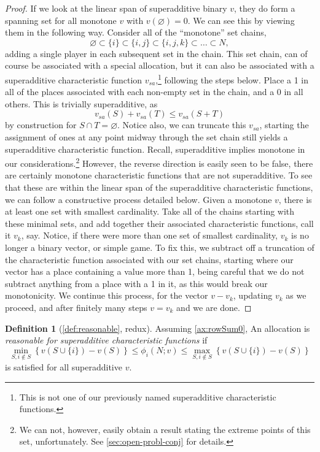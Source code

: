\documentclass[12pt,letterpaper,final]{article}
\theoremstyle{plain}
\theoremstyle{plain}
\theoremstyle{plain}
\theoremstyle{plain}
\theoremstyle{plain}
\theoremstyle{plain}
\theoremstyle{plain}
\theoremstyle{definition}
\newtheorem{definition}{Definition}[section]
\theoremstyle{definition}
\theoremstyle{definition}
\theoremstyle{definition}
\theoremstyle{definition}
\theoremstyle{remark}
\theoremstyle{remark}
\theoremstyle{remark}
\theoremstyle{remark}
\begin{document}
\begin{proof}
  If we look at the linear span of superadditive
  binary \(v\), they do form a spanning set for all monotone \(v\)
  with \(v(\varnothing) = 0\). We can see this by viewing them in the
  following way. Consider all of the ``monotone'' set chains,
  \[
    \varnothing \subset \{i\}\subset \{i,j\}\subset \{i,j,k\} \subset \ldots
    \subset N,
  \]
  adding a single player in each subsequent set in the chain. This set chain, can
  of course be associated with a special allocation, but it can also be
  associated with a superadditive characteristic function
  \(v_{sa}\),\footnote{This is not one of our previously named
    superadditive characteristic functions.}
  following the steps below. 
  Place a 1 in all of the places associated with each non-empty set in
  the chain, and a 0 in all others. This is trivially superadditive,
  as
  \[
    v_{sa}(S) + v_{sa}(T) \leq v_{sa}(S+T)
  \]
  by construction for \(S\cap T = \varnothing\). Notice also, we can
  truncate this \(v_{sa}\), starting the assignment of ones at any
  point midway through the set chain still yields a superadditive
  characteristic function.  Recall, superadditive implies
  monotone in our considerations.\footnote{We can not, however, easily obtain a
    result stating the extreme points of this set, unfortunately. See
    \cref{sec:open-probl-conj} for details.}
  However, the reverse direction is easily seen to be false, there are
  certainly monotone characteristic functions that are not superadditive. To see that
  these are within the linear span of the superadditive characteristic
  functions, we
  can follow a constructive process detailed below.
  Given a monotone \(v\), there is at least one set with smallest
  cardinality. Take all of the chains starting with these minimal sets,
  and add together their associated characteristic functions,
  call it \(v_{k}\), say. Notice, if there were more than one set of
  smallest cardinality, \(v_k\) is no longer a binary vector, or
  simple game. To fix
  this, we subtract off a truncation of the characteristic function associated with
  our set chains, starting where our vector has a place containing a
  value more than 1, being careful that we do not subtract anything
  from a place with a 1 in it, as this would break our monotonicity.
  We continue this process, for the vector \(v-v_k\), updating \(v_k\)
  as we proceed, and after finitely many steps \(v=v_k\) and we are done.
\end{proof}

\begin{definition}[\cref{def:reasonable}, redux]\label{def:reasonableRedux}
  Assuming \cref{ax:rowSum0}, An allocation is \emph{reasonable for
    superadditive characteristic functions} if
  \begin{equation}\label{eq:reiteratedBounds}
    \min_{S, i\notin S}\left\{ v\left(S \cup\{i\}\right) -v(S)\right\}
    \leq \phi_i(N;v) \leq \max_{S, i \notin
      S}\left\{v\left(S \cup \{i\}\right) - v(S)\right\}
  \end{equation}
  is satisfied for all superadditive \(v\).
\end{definition}
\end{document}

